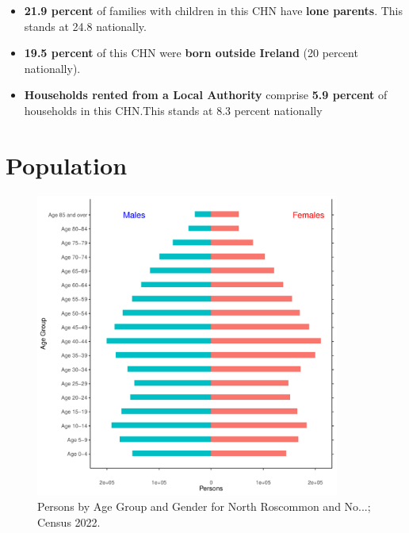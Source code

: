 \documentclass{article}
\begin{document}
\begin{itemize}
\item \textbf{21.9 percent} of families with children in this CHN have \textbf{lone parents}. This stands at 24.8 nationally.

\item \textbf{19.5 percent} of this CHN were \textbf{born outside Ireland} (20 percent nationally).

\item \textbf{Households rented from a Local Authority} comprise \textbf{5.9 percent} of households in this CHN.This stands at 8.3 percent nationally

\end{itemize}

\pagebreak

\section{Population} 
\label{sect:Pop}

\begin{figure}[h]
	\centering
	\includegraphics[width = 100mm]{../figures/PyramidPlot.pdf}
	\caption{Persons by Age Group and Gender for North Roscommon and No...; Census 2022.}
	\label{fig:2ae19629-1a6a-13a3-e055-000000000001}
	\end{figure}
\end{document}
